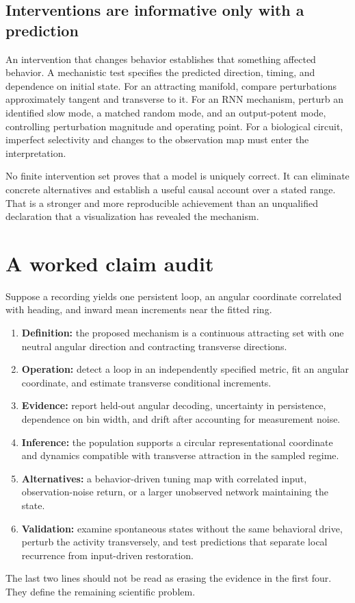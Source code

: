 \subsection{Interventions are informative only with a prediction}
An intervention that changes behavior establishes that something affected behavior. A mechanistic test specifies the predicted direction, timing, and dependence on initial state. For an attracting manifold, compare perturbations approximately tangent and transverse to it. For an RNN mechanism, perturb an identified slow mode, a matched random mode, and an output-potent mode, controlling perturbation magnitude and operating point. For a biological circuit, imperfect selectivity and changes to the observation map must enter the interpretation.

No finite intervention set proves that a model is uniquely correct. It can eliminate concrete alternatives and establish a useful causal account over a stated range. That is a stronger and more reproducible achievement than an unqualified declaration that a visualization has revealed the mechanism.

\section{A worked claim audit}
Suppose a recording yields one persistent loop, an angular coordinate correlated with heading, and inward mean increments near the fitted ring.
\begin{enumerate}
\item \textbf{Definition:} the proposed mechanism is a continuous attracting set with one neutral angular direction and contracting transverse directions.
\item \textbf{Operation:} detect a loop in an independently specified metric, fit an angular coordinate, and estimate transverse conditional increments.
\item \textbf{Evidence:} report held-out angular decoding, uncertainty in persistence, dependence on bin width, and drift after accounting for measurement noise.
\item \textbf{Inference:} the population supports a circular representational coordinate and dynamics compatible with transverse attraction in the sampled regime.
\item \textbf{Alternatives:} a behavior-driven tuning map with correlated input, observation-noise return, or a larger unobserved network maintaining the state.
\item \textbf{Validation:} examine spontaneous states without the same behavioral drive, perturb the activity transversely, and test predictions that separate local recurrence from input-driven restoration.
\end{enumerate}
The last two lines should not be read as erasing the evidence in the first four. They define the remaining scientific problem.

